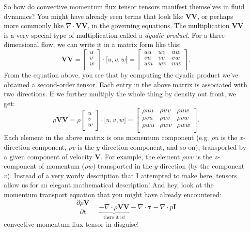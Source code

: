 \documentclass[10pt,twocolumn]{article}
\begin{document}
So how do convective momentum flux tensor tensors manifest themselves in fluid dynamics? You might have already seen terms that look like $\pmb{V} \pmb{V}$, or perhaps more commonly like $\nabla \cdot \pmb{V} \pmb{V}$, in the governing equations. The multiplication $\pmb{V} \pmb{V}$ is a very special type of multiplication called a \textit{dyadic product}. For a three-dimensional flow, we can write it in a matrix form like this:
\begin{equation*}
  \mathbf{V} \mathbf{V} =
  \begin{bmatrix}
  u \\
  v \\
  w \\
  \end{bmatrix}
  \cdot 
  \Big[ u , v , w \Big] = 
  \begin{bmatrix}
  uu & uv & uw\\
  vu & vv & vw \\
  wu & wv & ww \\
  \end{bmatrix}.
\end{equation*}
From the equation above, you see that by computing the dyadic product we've obtained a second-order tensor. Each entry in the above matrix is associated with two directions. If we further multiply the whole thing by density out front, we get:
\begin{equation*}
 \rho \mathbf{V} \mathbf{V} =
  \rho
  \begin{bmatrix}
  u \\
  v \\
  w \\
  \end{bmatrix}
  \cdot 
  \Big[ u , v , w \Big] = 
  \begin{bmatrix}
   \rho uu &  \rho uv &  \rho uw\\
   \rho vu &  \rho vv &  \rho vw \\
   \rho wu &  \rho wv &  \rho ww \\
  \end{bmatrix}.
\end{equation*}
Each element in the above matrix is one momentum component (e.g. $\rho u$ is the $x$-direction component, $\rho v$ is the $y$-direction component, and so on), transported by a given component of velocity $\pmb{V}$. For example, the element $\rho w v$ is the $z$-component of momentum ($\rho w$) transported in the $y$-direction (by the component $v$). Instead of a very wordy description that I attempted to make here, tensors allow us for an elegant mathematical description!
And hey, look at the momentum transport equation that you might have already encountered:
\begin{equation*}
\frac{\partial \rho \mathbf{V}}{\partial t} = \underbrace{- \nabla \cdot \rho \mathbf{V} \mathbf{V}}_\text{there it is!} - \nabla \cdot \pmb{\tau} - \nabla \cdot p \mathbf{I}
\end{equation*}
convective momentum flux tensor in disguise!
\end{document}
